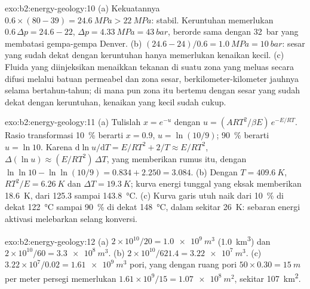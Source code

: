 \begin{solution}{exo:b2:energy-geology:10}
(a) Kekuatannya $0.6 \times (80 - 39) = \qty{24.6}{MPa} > \qty{22}{MPa}$: stabil. Keruntuhan memerlukan
$0.6\,\Delta p = 24.6 - 22$, $\Delta p = \qty{4.33}{MPa} = \qty{43}{bar}$, berorde sama dengan
\qty{32}{bar} yang membatasi gempa-gempa Denver. (b) $(24.6 - 24)/0.6 = \qty{1.0}{MPa} =
\qty{10}{bar}$: sesar yang sudah dekat dengan keruntuhan hanya memerlukan kenaikan kecil. (c) Fluida yang diinjeksikan menaikkan
tekanan di suatu zona yang meluas secara difusi melalui batuan permeabel dan zona sesar, berkilometer-kilometer
jauhnya selama bertahun-tahun; di mana pun zona itu bertemu dengan sesar yang sudah dekat dengan keruntuhan, kenaikan yang kecil sudah cukup.
\end{solution}

\begin{solution}{exo:b2:energy-geology:11}
(a) Tulislah $x = e^{-u}$ dengan $u = (ART^2/\beta E)\,e^{-E/RT}$. Rasio transformasi
\qty{10}{\percent} berarti $x = 0.9$, $u = \ln(10/9)$; \qty{90}{\percent} berarti $u = \ln 10$. Karena
$\mathrm{d}\ln u/\mathrm{d}T = E/RT^2 + 2/T \approx E/RT^2$, $\Delta(\ln u) \approx (E/RT^2)\,\Delta T$,
yang memberikan rumus itu, dengan $\ln\ln 10 - \ln\ln(10/9) = 0.834 + 2.250 = 3.084$. (b) Dengan $T =
\qty{409.6}{K}$, $RT^2/E = \qty{6.26}{K}$ dan $\Delta T = \qty{19.3}{K}$; kurva energi tunggal yang
eksak memberikan \qty{18.6}{K}, dari 125.3 sampai \qty{143.8}{\celsius}. (c) Kurva garis utuh naik dari
\qty{10}{\percent} di dekat \qty{122}{\celsius} sampai \qty{90}{\percent} di dekat \qty{148}{\celsius}, dalam sekitar
\qty{26}{K}: sebaran energi aktivasi melebarkan selang konversi.
\end{solution}

\begin{solution}{exo:b2:energy-geology:12}
(a) $2 \times 10^{10}/20 = \qty{1.0e9}{m^3}$ (\qty{1.0}{km^3}) dan $2 \times 10^{10}/60 =
\qty{3.3e8}{m^3}$. (b) $2 \times 10^{10}/621.4 = \qty{3.22e7}{m^3}$. (c) $3.22 \times 10^7/0.02 =
\qty{1.61e9}{m^3}$ pori, yang dengan ruang pori $50 \times 0.30 = \qty{15}{m}$ per meter
persegi memerlukan $1.61 \times 10^9/15 = \qty{1.07e8}{m^2}$, sekitar \qty{107}{km^2}.
\end{solution}

